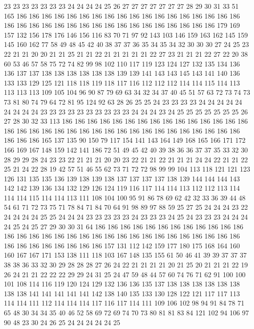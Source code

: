 23 23 23 23 23 23 23 24 24 24 24 25 26 27 27 27 27 27 27 27
28 29 30 31 33 51 165 186 186 186 186 186 186 186 186 186 186 186 186 186
186 186 186 186 186 186 186 186 186 186 186 186 186 186 186 186 186 186 186 186
186 186 179 169 157 132 156 178 176 146 156 116 83 70 71 97 92 143 103 146
159 163 162 145 159 145 160 162 77 58 49 48 45 42 40 38 37 37 36 35
34 35 34 32 30 30 30 27 24 25 23 22 21 21 20 20 21 21 25 21
21 22 21 21 21 21 21 22 27 23 21 21 21 22 27 22 20 38 60 53
46 57 58 75 72 74 82 99 98 102 110 117 119 123 124 127 132 135 134 136
136 137 137 138 138 138 138 138 138 139 139 141 143 143 145 143 141 140 136 133
133 129 125 121 118 118 119 118 117 116 112 112 112 114 114 115 114 113 113 113
113 109 105 104 96 90 87 79 69 63 34 32 34 37 40 45 51 57 63 72
73 74 73 73 81 80 74 79 64 72 81 95 124 92 63 28 26 25 25 24
23 23 23 23 24 24 24 24 24 24 24 24 24 23 23 23 23 23 23 23
23 23 23 24 24 24 23 24 25 25 25 25 25 25 25 26 27 28 30 32
33 113 186 186 186 186 186 186 186 186 186 186 186 186 186 186 186 186 186 186
186 186 186 186 186 186 186 186 186 186 186 186 186 186 186 186 186 186 186 165
137 135 90 150 79 117 154 141 143 164 149 168 165 166 171 172 166 169 167 148
159 142 141 186 72 51 49 45 42 40 39 38 36 36 37 37 35 33 32 30
28 29 29 28 24 23 23 22 21 21 21 20 20 23 22 21 21 22 21 21
21 24 24 22 21 21 22 25 21 24 22 28 19 42 57 51 46 55 62 73
71 72 72 98 99 99 104 113 118 121 121 123 126 131 135 135 136 139 138 139
138 137 137 137 137 138 139 144 144 144 143 142 142 139 136 134 132 129 126 124
119 116 117 114 114 113 112 112 113 114 114 114 115 114 114 113 111 108 104 100
95 91 86 78 69 62 42 32 33 36 39 44 48 54 61 71 72 73 75 71
78 84 71 84 70 64 91 98 89 97 88 59 25 27 25 24 24 24 23 22
24 24 24 24 25 25 24 24 24 23 23 23 23 23 24 23 23 23 24 25
24 23 23 23 24 24 24 24 25 24 25 27 29 30 30 31 64 186 186 186
186 186 186 186 186 186 186 186 186 186 186 186 186 186 186 186 186 186 186 186
186 186 186 186 186 186 186 186 186 186 186 186 186 186 186 186 157 131 112 142
159 177 180 175 168 164 160 160 167 167 171 153 138 111 118 103 167 148 135 155
61 50 46 41 39 39 37 37 37 38 38 36 33 32 30 29 28 28 28 27
26 24 22 21 21 21 21 20 21 25 20 21 21 21 22 19 26 24 21 21
22 22 22 29 29 24 31 25 24 47 59 48 44 57 60 74 76 71 62 91
100 100 101 108 114 116 119 120 124 129 132 136 136 135 137 138 138 138 138 138
138 138 138 141 141 141 141 141 142 138 140 135 133 130 128 122 121 117 117 113
114 114 111 112 114 114 114 117 116 117 114 111 109 106 102 98 94 91 84 78
71 65 48 30 34 34 35 40 46 52 58 69 72 69 74 70 73 80 81 81
83 84 121 102 94 106 97 90 48 23 30 24 26 25 24 24 24 24 24 25
